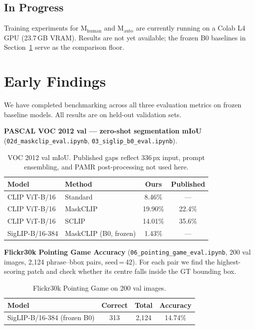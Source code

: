 \documentclass[10pt,onecolumn]{article}
\begin{document}
\subsection{In Progress}

Training experiments for M$_\text{human}$ and M$_\text{auto}$ are currently
running on a Colab L4 GPU (23.7\,GB VRAM). Results are not yet available; the
frozen B0 baselines in Section~\ref{sec:findings} serve as the comparison floor.

\section{Early Findings}
\label{sec:findings}

We have completed benchmarking across all three evaluation metrics on frozen
baseline models. All results are on held-out validation sets.

\textbf{PASCAL VOC 2012 val --- zero-shot segmentation mIoU}
(\texttt{02d\_maskclip\_eval.ipynb}, \texttt{03\_siglip\_b0\_eval.ipynb}).

\begin{table}[h]
\centering
\small
\begin{tabular}{llcc}
\toprule
\textbf{Model} & \textbf{Method} & \textbf{Ours} & \textbf{Published} \\
\midrule
CLIP ViT-B/16   & Standard  & 8.46\%  & ---    \\
CLIP ViT-B/16   & MaskCLIP  & 19.90\% & 22.4\% \\
CLIP ViT-B/16   & SCLIP     & 14.01\% & 35.6\% \\
\midrule
SigLIP-B/16-384 & MaskCLIP (B0, frozen) & 1.43\% & --- \\
\bottomrule
\end{tabular}
\caption{VOC 2012 val mIoU. Published gaps reflect 336\,px input, prompt
ensembling, and PAMR post-processing not used here.}
\end{table}

\textbf{Flickr30k Pointing Game Accuracy}
(\texttt{06\_pointing\_game\_eval.ipynb}, 200 val images, 2,124 phrase--bbox pairs,
seed\,=\,42). For each pair we find the highest-scoring patch and check whether
its centre falls inside the GT bounding box.

\begin{table}[h]
\centering
\small
\begin{tabular}{lccc}
\toprule
\textbf{Model} & \textbf{Correct} & \textbf{Total} & \textbf{Accuracy} \\
\midrule
SigLIP-B/16-384 (frozen B0) & 313 & 2,124 & 14.74\% \\
\bottomrule
\end{tabular}
\caption{Flickr30k Pointing Game on 200 val images.}
\end{table}
\end{document}
